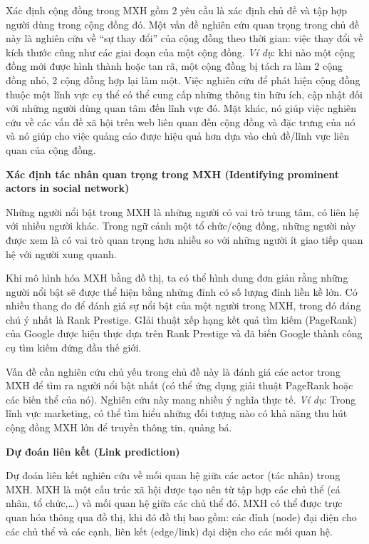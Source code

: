 \documentclass[12pt]{extarticle}
\begin{document}
			\par Xác định cộng đồng trong MXH gồm 2 yêu cầu là xác định chủ đề và tập hợp người dùng trong cộng đồng đó. Một vấn đề nghiên cứu quan trọng trong chủ đề này là nghiên cứu về “sự thay đổi” của cộng đồng theo thời gian: việc thay đổi về kích thước cũng như các giai đoạn của một cộng đồng. \textit{Ví dụ}: khi nào một cộng đồng mới được hình thành hoặc tan rã, một cộng đồng bị tách ra làm 2 cộng đồng nhỏ, 2 cộng đồng hợp lại làm một. Việc nghiên cứu để phát hiện cộng đồng thuộc một lĩnh vực cụ thể có thể cung cấp những thông tin hữu ích, cập nhật đối với những người dùng quan tâm đến lĩnh vực đó. Mặt khác, nó giúp việc nghiên cứu về các vấn đề xã hội trên web liên quan đến cộng đồng và đặc trưng của nó và nó giúp cho việc quảng cáo được hiệu quả hơn dựa vào chủ đề/lĩnh vực liên quan của cộng đồng.
			\par \textbf{Xác định tác nhân quan trọng trong MXH (Identifying prominent actors in social network)}
			\par Những người nổi bật trong MXH là những người có vai trò trung tâm, có liên hệ với nhiều người khác. Trong ngữ cảnh một tổ chức/cộng đồng, những người này được xem là có vai trò quan trọng hơn nhiều so với những người ít giao tiếp quan hệ với người xung quanh.
			\par Khi mô hình hóa MXH bằng đồ thị, ta có thể hình dung đơn giản rằng những người nổi bật sẽ được thể hiện bằng những đỉnh có số lượng đỉnh liền kề lớn. Có nhiều thang đo để đánh giá sự nổi bật của một người trong MXH, trong đó đáng chú ý nhất là Rank Prestige. GIải thuật xếp hạng kết quả tìm kiếm (PageRank) của Google được hiện thực dựa trên Rank Prestige và đã biến Google thành công cụ tìm kiếm đứng đầu thế giới.
			\par Vấn đề cần nghiên cứu chủ yếu trong chủ đề này là đánh giá các actor trong MXH để tìm ra người nổi bật nhất (có thể ứng dụng giải thuật PageRank hoặc các biến thể của nó). Nghiên cứu này mang nhiều ý nghĩa thực tế. \textit{Ví dụ}: Trong lĩnh vực marketing, có thể tìm hiểu những đối tượng nào có khả năng thu hút cộng đồng MXH lớn để truyền thông tin, quảng bá.
			\par \textbf{Dự đoán liên kết (Link prediction)}
			\par Dự đoán liên kết nghiên cứu về mối quan hệ giữa các actor (tác nhân) trong MXH. MXH là một cấu trúc xã hội được tạo nên từ tập hợp các chủ thể (cá nhân, tổ chức,…) và mối quan hệ giữa các chủ thể đó. MXH có thể được trực quan hóa thông qua đồ thị, khi đó đồ thị bao gồm: các đỉnh (node) đại diện cho các chủ thể và các cạnh, liên kết (edge/link) đại diện cho các mối quan hệ.
\end{document}

